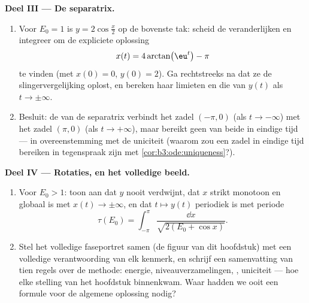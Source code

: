 \begin{problem}
\medskip
\noindent\textbf{Deel III --- De separatrix.}
\begin{enumerate}[resume]
  \item Voor $E_0 = 1$ is $y = 2\cos\frac x2$ op de bovenste
        tak: scheid de veranderlijken en integreer om de
        expliciete oplossing
        \[
        x(t) = 4\arctan\bigl(\eu^{t}\bigr) - \pi
        \]
        te vinden (met $x(0) = 0$, $y(0) = 2$). Ga rechtstreeks
        na dat ze de slingervergelijking oplost, en bereken haar
        limieten en die van $y(t)$ als $t \to \pm\infty$.
  \item Besluit: de  van de separatrix verbindt het zadel
        $(-\pi, 0)$ (als $t \to -\infty$) met het zadel $(\pi,
        0)$ (als $t \to +\infty$), maar bereikt geen van beide in
        eindige tijd --- in overeenstemming met de uniciteit
        (waarom zou een zadel in eindige tijd bereiken in
        tegenspraak zijn met \cref{cor:b3:ode:uniqueness}?).
\end{enumerate}

\medskip
\noindent\textbf{Deel IV --- Rotaties, en het volledige beeld.}
\begin{enumerate}[resume]
  \item Voor $E_0 > 1$: toon aan dat $y$ nooit verdwijnt, dat $x$
        strikt monotoon en globaal is met $x(t) \to \pm\infty$,
        en dat $t \mapsto y(t)$ periodiek is met periode
        \[
        \tau(E_0) = \int_{-\pi}^{\pi}
        \frac{\dd x}{\sqrt{2(E_0 + \cos x)}} .
        \]
  \item Stel het volledige faseportret samen (de figuur van dit
        hoofdstuk) met een volledige verantwoording van elk
        kenmerk, en schrijf een samenvatting van tien regels over
        de methode: energie, niveauverzamelingen, ,
        uniciteit --- hoe elke stelling van het hoofdstuk
        binnenkwam. Waar hadden we ooit een formule voor de
        algemene oplossing nodig?
\end{enumerate}


\end{problem}
